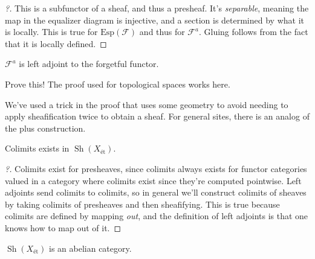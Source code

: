 \begin{proof}[?]

This is a subfunctor of a sheaf, and thus a presheaf. It's
\emph{separable}, meaning the map in the equalizer diagram is injective,
and a section is determined by what it is locally. This is true for
\(\mathrm{Esp}(\mathcal{F})\) and thus for \(\mathcal{F}^a\). Gluing
follows from the fact that it is locally defined.

\end{proof}

\begin{proposition}[?]

\(\mathcal{F}^a\) is left adjoint to the forgetful functor.

\end{proposition}

\begin{exercise}[Important!]

Prove this! The proof used for topological spaces works here.

\end{exercise}

\begin{remark}

We've used a trick in the proof that uses some geometry to avoid needing
to apply sheafification twice to obtain a sheaf. For general sites,
there is an analog of the plus construction.

\end{remark}

\begin{corollary}[?]

Colimits exists in \({\operatorname{Sh}}(X_\text{ét})\).

\end{corollary}

\begin{proof}[?]

Colimits exist for presheaves, since colimits always exists for functor
categories valued in a category where colimits exist since they're
computed pointwise. Left adjoints send colimits to colimits, so in
general we'll construct colimits of sheaves by taking colimits of
presheaves and then sheafifying. This is true because colimits are
defined by mapping \emph{out}, and the definition of left adjoints is
that one knows how to map out of it.

\end{proof}

\begin{corollary}

\({\operatorname{Sh}}(X_\text{ét})\) is an abelian category.

\end{corollary}

